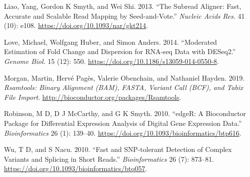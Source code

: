 \documentclass[14pt,]{article}
\begin{document}
\begin{CSLReferences}{1}{0}
\leavevmode\hypertarget{ref-Liao2013-bn}{}%
Liao, Yang, Gordon K Smyth, and Wei Shi. 2013. {``The Subread Aligner: Fast, Accurate and Scalable Read Mapping by Seed-and-Vote.''} \emph{Nucleic Acids Res.} 41 (10): e108. \url{https://doi.org/10.1093/nar/gkt214}.

\leavevmode\hypertarget{ref-Love2014-sh}{}%
Love, Michael, Wolfgang Huber, and Simon Anders. 2014. {``Moderated Estimation of Fold Change and Dispersion for {RNA-seq} Data with {DESeq2}.''} \emph{Genome Biol.} 15 (12): 550. \url{https://doi.org/10.1186/s13059-014-0550-8}.

\leavevmode\hypertarget{ref-Rsamtools}{}%
Morgan, Martin, Hervé Pagès, Valerie Obenchain, and Nathaniel Hayden. 2019. \emph{Rsamtools: Binary Alignment (BAM), FASTA, Variant Call (BCF), and Tabix File Import}. \url{http://bioconductor.org/packages/Rsamtools}.

\leavevmode\hypertarget{ref-Robinson2010-uk}{}%
Robinson, M D, D J McCarthy, and G K Smyth. 2010. {``edgeR: A Bioconductor Package for Differential Expression Analysis of Digital Gene Expression Data.''} \emph{Bioinformatics} 26 (1): 139--40. \url{https://doi.org/10.1093/bioinformatics/btp616}.

\leavevmode\hypertarget{ref-Wu2010-iq}{}%
Wu, T D, and S Nacu. 2010. {``Fast and {SNP-tolerant} Detection of Complex Variants and Splicing in Short Reads.''} \emph{Bioinformatics} 26 (7): 873--81. \url{https://doi.org/10.1093/bioinformatics/btq057}.

\end{CSLReferences}
\end{document}

